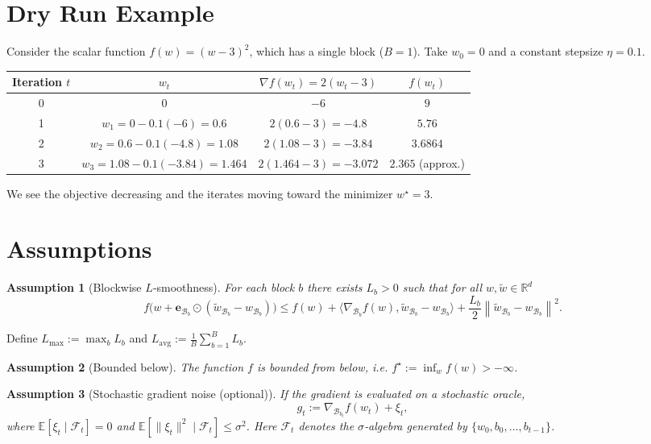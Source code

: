 \documentclass[11pt]{article}
\newcommand{\EE}{\mathbb{E}}
\newcommand{\RR}{\mathbb{R}}
\newcommand{\norm}[1]{\left\|#1\right\|}
\newcommand{\grad}{\nabla}
\newcommand{\block}[1]{\mathcal{B}_{#1}}
\newtheorem{assumption}{Assumption}
\begin{document}
\section*{Dry Run Example}
Consider the scalar function $f(w)=(w-3)^2$, which has a single block
($B=1$).  Take $w_0=0$ and a constant stepsize $\eta=0.1$.

\begin{center}
\begin{tabular}{c|c|c|c}
Iteration $t$ & $w_t$ & $\grad f(w_t)=2(w_t-3)$ & $f(w_t)$\\ \hline
0 & $0$ & $-6$ & $9$\\
1 & $w_1 = 0 -0.1(-6)=0.6$ & $2(0.6-3)=-4.8$ & $5.76$\\
2 & $w_2 = 0.6 -0.1(-4.8)=1.08$ & $2(1.08-3)=-3.84$ & $3.6864$\\
3 & $w_3 = 1.08 -0.1(-3.84)=1.464$ & $2(1.464-3)=-3.072$ & $2.365$ (approx.)\\
\end{tabular}
\end{center}
We see the objective decreasing and the iterates moving toward the minimizer $w^\star=3$.

\newpage
\section*{Assumptions}
\begin{assumption}[Blockwise $L$‑smoothness]
\label{ass:smooth}
For each block $b$ there exists $L_b>0$ such that for all $w,\tilde w\in\RR^{d}$
\[
f\!\big(w+\mathbf{e}_{\block{b}}\odot ( \tilde w_{\block{b}}-w_{\block{b}} )\big)
\le
f(w)+\langle \grad_{\block{b}}f(w),\tilde w_{\block{b}}-w_{\block{b}}\rangle
+\frac{L_b}{2}\norm{\tilde w_{\block{b}}-w_{\block{b}}}^2 .
\]
\end{assumption}
Define $L_{\max}:=\max_{b}L_b$ and $L_{\text{avg}}:=\frac1B\sum_{b=1}^{B}L_b$.

\begin{assumption}[Bounded below]
\label{ass:lower}
The function $f$ is bounded from below, i.e. $f^\star:=\inf_{w}f(w)>-\infty$.
\end{assumption}

\begin{assumption}[Stochastic gradient noise (optional)]
\label{ass:noise}
If the gradient is evaluated on a stochastic oracle,
\[
g_t:=\grad_{\block{b_t}} f(w_t)+\xi_t,
\]
where $\EE[\xi_t\mid \mathcal{F}_t]=0$ and
$\EE[\|\xi_t\|^2\mid \mathcal{F}_t]\le\sigma^2$.
Here $\mathcal{F}_t$ denotes the $\sigma$‑algebra generated by
$\{w_0,b_0,\dots ,b_{t-1}\}$.
\end{assumption}
\end{document}
